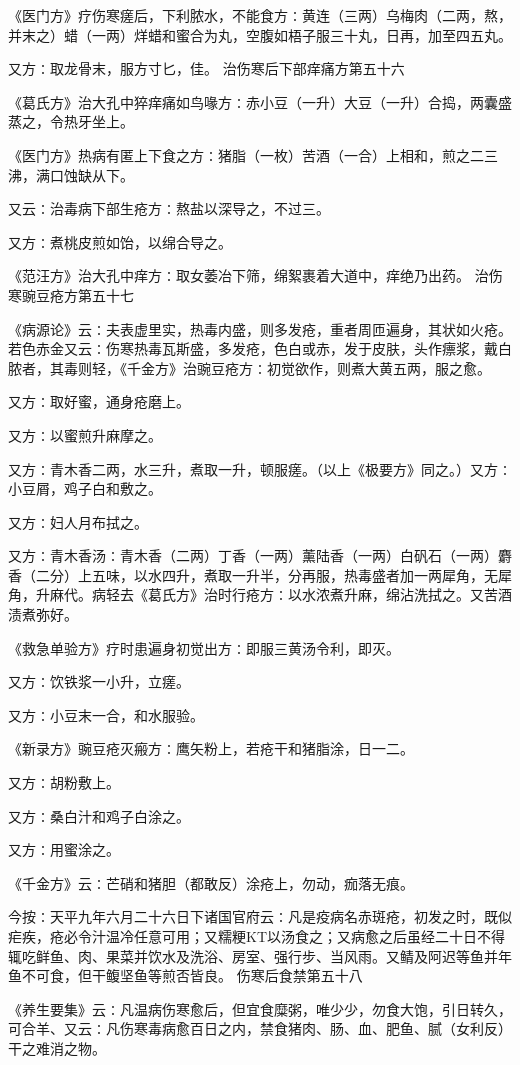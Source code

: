 \documentclass[a4paper,12pt,UTF8,twoside]{ctexbook}
\begin{document}
《医门方》疗伤寒瘥后，下利脓水，不能食方∶黄连（三两）乌梅肉（二两，熬，并末之）蜡（一两）烊蜡和蜜合为丸，空腹如梧子服三十丸，日再，加至四五丸。

又方∶取龙骨末，服方寸匕，佳。
治伤寒后下部痒痛方第五十六

《葛氏方》治大孔中猝痒痛如鸟喙方∶赤小豆（一升）大豆（一升）合捣，两囊盛蒸之，令热牙坐上。

《医门方》热病有匿上下食之方∶猪脂（一枚）苦酒（一合）上相和，煎之二三沸，满口蚀缺从下。

又云∶治毒病下部生疮方∶熬盐以深导之，不过三。

又方∶煮桃皮煎如饴，以绵合导之。

《范汪方》治大孔中痒方∶取女萎冶下筛，绵絮裹着大道中，痒绝乃出药。
治伤寒豌豆疮方第五十七

《病源论》云∶夫表虚里实，热毒内盛，则多发疮，重者周匝遍身，其状如火疮。若色赤金又云∶伤寒热毒瓦斯盛，多发疮，色白或赤，发于皮肤，头作瘭浆，戴白脓者，其毒则轻，《千金方》治豌豆疮方∶初觉欲作，则煮大黄五两，服之愈。

又方∶取好蜜，通身疮磨上。

又方∶以蜜煎升麻摩之。

又方∶青木香二两，水三升，煮取一升，顿服瘥。（以上《极要方》同之。）又方∶小豆屑，鸡子白和敷之。

又方∶妇人月布拭之。

又方∶青木香汤∶青木香（二两）丁香（一两）薰陆香（一两）白矾石（一两）麝香（二分）上五味，以水四升，煮取一升半，分再服，热毒盛者加一两犀角，无犀角，升麻代。病轻去《葛氏方》治时行疮方∶以水浓煮升麻，绵沾洗拭之。又苦酒渍煮弥好。

《救急单验方》疗时患遍身初觉出方∶即服三黄汤令利，即灭。

又方∶饮铁浆一小升，立瘥。

又方∶小豆末一合，和水服验。

《新录方》豌豆疮灭瘢方∶鹰矢粉上，若疮干和猪脂涂，日一二。

又方∶胡粉敷上。

又方∶桑白汁和鸡子白涂之。

又方∶用蜜涂之。

《千金方》云∶芒硝和猪胆（都敢反）涂疮上，勿动，痂落无痕。

今按∶天平九年六月二十六日下诸国官府云∶凡是疫病名赤斑疮，初发之时，既似疟疾，疮必令汁温冷任意可用；又糯粳KT以汤食之；又病愈之后虽经二十日不得辄吃鲜鱼、肉、果菜并饮水及洗浴、房室、强行步、当风雨。又鲭及阿迟等鱼并年鱼不可食，但干鳆坚鱼等煎否皆良。
伤寒后食禁第五十八

《养生要集》云∶凡温病伤寒愈后，但宜食糜粥，唯少少，勿食大饱，引日转久，可合羊、又云∶凡伤寒毒病愈百日之内，禁食猪肉、肠、血、肥鱼、腻（女利反）干之难消之物。
\end{document}
